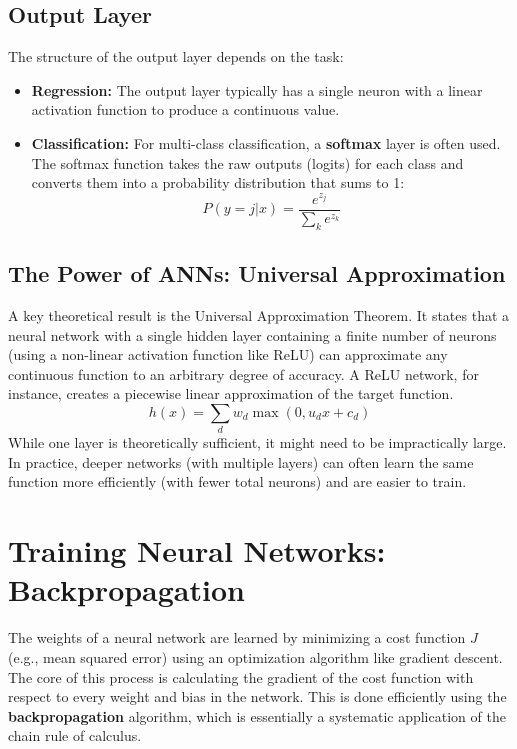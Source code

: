 \documentclass{article}
\begin{document}
\begin{multicols}{2}
\subsection{Output Layer}
The structure of the output layer depends on the task:
\begin{itemize}
    \item \textbf{Regression:} The output layer typically has a single neuron with a linear activation function to produce a continuous value.
    \item \textbf{Classification:} For multi-class classification, a \textbf{softmax} layer is often used. The softmax function takes the raw outputs (logits) for each class and converts them into a probability distribution that sums to 1:
    $$ P(y=j|x) = \frac{e^{z_j}}{\sum_{k} e^{z_k}} $$
\end{itemize}

\subsection{The Power of ANNs: Universal Approximation}
A key theoretical result is the Universal Approximation Theorem. It states that a neural network with a single hidden layer containing a finite number of neurons (using a non-linear activation function like ReLU) can approximate any continuous function to an arbitrary degree of accuracy. A ReLU network, for instance, creates a piecewise linear approximation of the target function.
$$ h(x) = \sum_{d} w_d \max(0, u_d x + c_d) $$
While one layer is theoretically sufficient, it might need to be impractically large. In practice, deeper networks (with multiple layers) can often learn the same function more efficiently (with fewer total neurons) and are easier to train.

\section{Training Neural Networks: Backpropagation}
The weights of a neural network are learned by minimizing a cost function $J$ (e.g., mean squared error) using an optimization algorithm like gradient descent. The core of this process is calculating the gradient of the cost function with respect to every weight and bias in the network. This is done efficiently using the \textbf{backpropagation} algorithm, which is essentially a systematic application of the chain rule of calculus.


\end{multicols}
\end{document}
